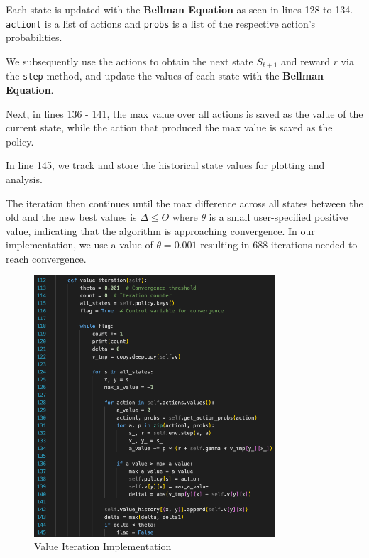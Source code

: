 \noindent Each state is updated with the \textbf{Bellman Equation} as seen in lines 128 to 134. \texttt{actionl} is a list of actions and \texttt{probs} is a list of the respective action's probabilities. \vspace{10pt}

\noindent We subsequently use the actions to obtain the next state $S_{t+1}$ and reward $r$ via the \texttt{step} method, and update the values of each state with the \textbf{Bellman Equation}. \vspace{10pt}

\noindent Next, in lines 136 - 141, the max value over all actions is saved as the value of the current state, while the action that produced the max value is saved as the policy. \vspace{10pt}

\noindent In line 145, we track and store the historical state values for plotting and analysis. \vspace{10pt}

\noindent The iteration then continues until the max difference across all states between the old and the new best values is $\Delta \leq \Theta$ where $\theta$ is a small user-specified positive value, indicating that the algorithm is approaching convergence. In our implementation, we use a value of $\theta = 0.001$ resulting in 688 iterations needed to reach convergence. 

\begin{figure}[H]
    \centering
    \includegraphics[width=0.8\textwidth]{images/vi_impl.png}
    \caption{Value Iteration Implementation}
\end{figure}

